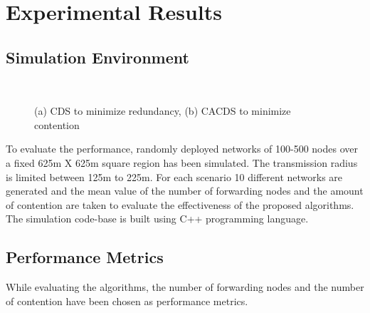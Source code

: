 \section{Experimental Results}
\label{Experimental Results}

\subsection{Simulation Environment}
\begin{figure}[h] 
    \centering
    \label{subfig1}\hfill
    \label{subfig2}\\
  \caption{(a) CDS to minimize redundancy, (b) CACDS to minimize contention}
  \label{ac} 
\end{figure}
To evaluate the performance, randomly deployed networks of 100-500 nodes over a fixed 625m X 625m square region has been simulated. The transmission radius is limited between 125m to 225m. 
For each scenario 10 different networks are generated and the mean value of the number of forwarding nodes and the amount of contention are taken to evaluate the effectiveness of the proposed algorithms. The simulation code-base is built using C++ programming language. 

\subsection{Performance Metrics}
While evaluating the algorithms, the number of forwarding nodes and the number of contention have been chosen as performance metrics.

